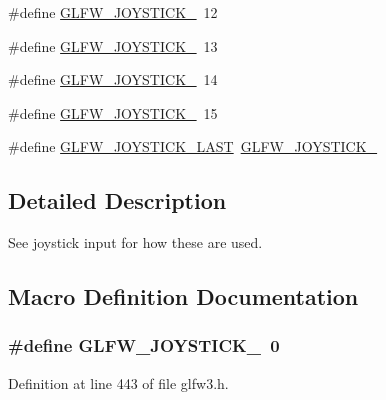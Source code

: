 \begin{DoxyCompactItemize}
\#define \hyperlink{group__joysticks_ga5c84fb4e49bf661d7d7c78eb4018c508}{G\+L\+F\+W\+\_\+\+J\+O\+Y\+S\+T\+I\+C\+K\+\_}~12
\item 
\#define \hyperlink{group__joysticks_ga89540873278ae5a42b3e70d64164dc74}{G\+L\+F\+W\+\_\+\+J\+O\+Y\+S\+T\+I\+C\+K\+\_}~13
\item 
\#define \hyperlink{group__joysticks_ga7b02ab70daf7a78bcc942d5d4cc1dcf9}{G\+L\+F\+W\+\_\+\+J\+O\+Y\+S\+T\+I\+C\+K\+\_}~14
\item 
\#define \hyperlink{group__joysticks_ga453edeeabf350827646b6857df4f80ce}{G\+L\+F\+W\+\_\+\+J\+O\+Y\+S\+T\+I\+C\+K\+\_}~15
\item 
\#define \hyperlink{group__joysticks_ga9ca13ebf24c331dd98df17d84a4b72c9}{G\+L\+F\+W\+\_\+\+J\+O\+Y\+S\+T\+I\+C\+K\+\_\+\+L\+A\+S\+T}~\hyperlink{group__joysticks_ga453edeeabf350827646b6857df4f80ce}{G\+L\+F\+W\+\_\+\+J\+O\+Y\+S\+T\+I\+C\+K\+\_}
\end{DoxyCompactItemize}


\subsection{Detailed Description}
See joystick input for how these are used. 

\subsection{Macro Definition Documentation}
\hypertarget{group__joysticks_ga34a0443d059e9f22272cd4669073f73d}{}
\subsubsection[{G\+L\+F\+W\+\_\+\+J\+O\+Y\+S\+T\+I\+C\+K\+\_\+1}]{\setlength{\rightskip}{0pt plus 5cm}\#define G\+L\+F\+W\+\_\+\+J\+O\+Y\+S\+T\+I\+C\+K\+\_~0}\label{group__joysticks_ga34a0443d059e9f22272cd4669073f73d}


Definition at line 443 of file glfw3.\+h.

\hypertarget{group__joysticks_gaef55389ee605d6dfc31aef6fe98c54ec}{}
